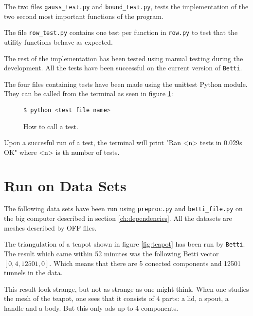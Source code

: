 \documentclass[11pt,a4paper,twoside, openright]{report}
\begin{document}
The two files \texttt{gauss\_test.py} and \texttt{bound\_test.py}, tests the implementation of the two second most important functions of the program.

The file \texttt{row\_test.py} contains one test per function in \texttt{row.py} to test that the utility functions behave as expected.

The rest of the implementation has been tested using manual testing during the development. All the tests have been successful on the current version of \texttt{Betti}.

The four files containing tests have been made using the unittest Python module. They can be called from the terminal as seen in figure \ref{fig:how2test}:
\begin{figure}[H]
\begin{lstlisting}[language=bash]
$ python <test file name>
\end{lstlisting}
\caption{How to call a test.}
\label{fig:how2test}
\end{figure}
Upon a succesful run of a test, the terminal will print "Ran <n> tests in 0.029s OK" where <n> is th number of tests.

\section{Run on Data Sets}\label{ch:test_data}
The following data sets have been run using \texttt{preproc.py} and \texttt{betti\_file.py} on the big computer described in section \ref{ch:dependencies}. All the datasets are meshes described by OFF files. 

The triangulation of a teapot shown in figure \ref{fig:teapot} has been run by \texttt{Betti}. The result which came within 52 minutes was the following Betti vector $[0,4,12501,0]$. Which means that there are 5 conected components and 12501 tunnels in the data.

This result look strange, but not as strange as one might think. When one studies the mesh of the teapot, one sees that it consists of 4 parts: a lid, a spout, a handle and a body. But this only ads up to 4 components.
\end{document}
